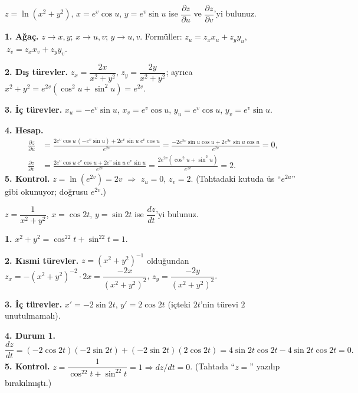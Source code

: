 \begin{soru}
$z=\ln(x^2+y^2)$, $x=e^{v}\cos u$, $y=e^{v}\sin u$ ise $\dfrac{\partial z}{\partial u}$ ve $\dfrac{\partial z}{\partial v}$'yi bulunuz.
\end{soru}
\begin{cevap}
\textbf{1. Ağaç.} $z\to x,y$; $x\to u,v$; $y\to u,v$. Formüller:
$z_u=z_xx_u+z_yy_u$, $\ z_v=z_xx_v+z_yy_v$.

\textbf{2. Dış türevler.} $z_x=\dfrac{2x}{x^2+y^2}$, $z_y=\dfrac{2y}{x^2+y^2}$; ayrıca $x^2+y^2=e^{2v}(\cos^2u+\sin^2u)=e^{2v}$.

\textbf{3. İç türevler.} $x_u=-e^{v}\sin u$, $x_v=e^{v}\cos u$, $y_u=e^{v}\cos u$, $y_v=e^{v}\sin u$.

\textbf{4. Hesap.}
\begin{align*}
\frac{\partial z}{\partial u}&=\frac{2e^{v}\cos u\,(-e^{v}\sin u)+2e^{v}\sin u\;e^{v}\cos u}{e^{2v}}=\frac{-2e^{2v}\sin u\cos u+2e^{2v}\sin u\cos u}{e^{2v}}=\boxed{0},\\[4pt]
\frac{\partial z}{\partial v}&=\frac{2e^{v}\cos u\;e^{v}\cos u+2e^{v}\sin u\;e^{v}\sin u}{e^{2v}}=\frac{2e^{2v}(\cos^2u+\sin^2u)}{e^{2v}}=\boxed{2}.
\end{align*}
\textbf{5. Kontrol.} $z=\ln(e^{2v})=2v$ $\Rightarrow$ $z_u=0$, $z_v=2$. \checkmark
(Tahtadaki kutuda üs ``$e^{2u}$'' gibi okunuyor; doğrusu $e^{2v}$.)
\end{cevap}

\begin{soru}
$z=\dfrac{1}{x^2+y^2}$, $x=\cos2t$, $y=\sin2t$ ise $\dfrac{dz}{dt}$'yi bulunuz.
\end{soru}
\begin{cevap}
\textbf{1.} $x^2+y^2=\cos^22t+\sin^22t=1$.

\textbf{2. Kısmi türevler.} $z=(x^2+y^2)^{-1}$ olduğundan
$z_x=-(x^2+y^2)^{-2}\cdot2x=\dfrac{-2x}{(x^2+y^2)^2}$, $z_y=\dfrac{-2y}{(x^2+y^2)^2}$.

\textbf{3. İç türevler.} $x'=-2\sin2t$, $y'=2\cos2t$ (içteki $2t$'nin türevi $2$ unutulmamalı).

\textbf{4. Durum 1.}
\[
\frac{dz}{dt}=(-2\cos2t)(-2\sin2t)+(-2\sin2t)(2\cos2t)=4\sin2t\cos2t-4\sin2t\cos2t=\boxed{0}.
\]
\textbf{5. Kontrol.} $z=\dfrac{1}{\cos^22t+\sin^22t}=1\Rightarrow dz/dt=0$. (Tahtada ``$z=$'' yazılıp bırakılmıştı.)
\end{cevap}

